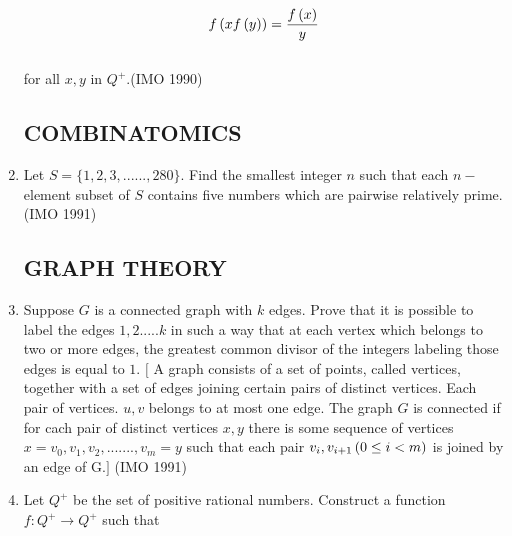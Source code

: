 \begin{enumerate}
			\begin{align*}  f\left(xf\left(y\right)\right)= \frac{f\left(x\right)}{y} \end{align*}\\ for all $x , y$ in $Q^+$.\hfill(IMO 1990)


      \subsection*{COMBINATOMICS}

  \item Let $S = \{1,2,3,......,280\}$. Find the smallest integer $n$ such that each $n-$ element subset of $S$ contains five numbers which are pairwise relatively prime.\hfill(IMO 1991)

	  \subsection*{GRAPH THEORY}

  \item Suppose $G$ is a connected graph with $k$ edges. Prove that it is possible to label the edges $1,2.....k$ in such a way that at each vertex which belongs to two or more edges, the greatest common divisor of the integers labeling those edges is equal to $1$.
	  $[$ A graph consists of a set of points, called vertices, together with a set of edges joining certain pairs of distinct vertices. Each pair of vertices. $u, v$ belongs to at most one edge. The graph $G$ is connected if for cach pair of distinct vertices $x, y$ there is some sequence of vertices   $x=v_0,v_1,v_2,.......,v_m = y$  such that each pair $v_i,v_{i+1}\left(0\leq i < m\right)$ is joined by an edge of G$.]$ \hfill(IMO 1991)
	  \item Let $Q^+$ be the set of positive rational numbers. Construct a function $ f: Q^+ \rightarrow Q^+$ such that 


\end{enumerate}
